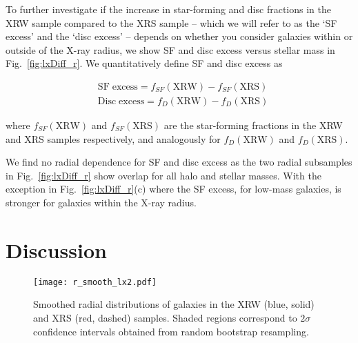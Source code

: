 To further investigate if the increase in star-forming and disc
fractions in the XRW sample compared to the XRS sample -- which we
will refer to as the `SF excess' and the `disc excess' -- depends on
whether you consider galaxies within or outside of the X-ray radius,
we show SF and disc excess versus stellar mass in
Fig.~\ref{fig:lxDiff_r}.  We quantitatively define SF and disc excess
as

\begin{align}
  & \mathrm{SF}\;\mathrm{excess} = f_{SF}(\mathrm{XRW}) -
  f_{SF}(\mathrm{XRS}) \label{eq:f_sf} \\
  & \mathrm{Disc}\;\mathrm{excess} = f_{D}(\mathrm{XRW}) -
  f_{D}(\mathrm{XRS}) \label{eq:f_d}
\end{align}

\noindent
where $f_{SF}(\mathrm{XRW})$ and $f_{SF}(\mathrm{XRS})$ are the
star-forming fractions in the XRW and XRS samples respectively, and
analogously for $f_D(\mathrm{XRW})$ and $f_D(\mathrm{XRS})$.
\par
We find no radial dependence for SF and disc excess as the two radial
subsamples in Fig.~\ref{fig:lxDiff_r} show overlap for all halo and
stellar masses.  With the exception in Fig.~\ref{fig:lxDiff_r}(c) where
the SF excess, for low-mass galaxies, is stronger for galaxies within
the X-ray radius. 

\section{Discussion}
\label{sec:discussion_x}

\begin{figure}[!tp]
  \centering
  \texttt{[image: r\_smooth\_lx2.pdf]}
  \caption{Smoothed radial distributions of galaxies in the XRW (blue,
  solid) and XRS (red, dashed) samples.  Shaded regions correspond to
  $2\sigma$ confidence intervals obtained from random bootstrap resampling.}
  \label{fig:r_smooth_lx2}
\end{figure}


